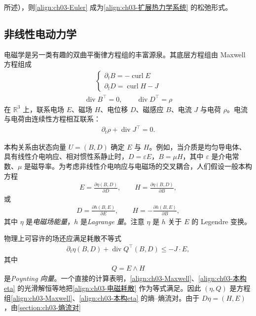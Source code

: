 ﻿\documentclass[../../main.tex]{subfiles}
\begin{document}
所述），则\eqref{align:ch03-Euler} 成为\eqref{align:ch03-扩展热力学系统} 的松弛形式。

\subsection{非线性电动力学}\label{subsection:ch03-非线性电动力学}

电磁学是另一类有趣的双曲平衡律方程组的丰富源泉。其底层方程组由 Maxwell 方程组成
\begin{align}
\begin{cases}
\partial_{t}B=-\operatorname{curl}E\\
\partial_{t}D=\operatorname{curl}H-J
\end{cases}
\label{align:ch03-Maxwell}
\end{align}
\begin{align}
\operatorname{div}B^{\top}=0,\qquad \operatorname{div}D^{\top}=\rho
\label{align:ch03-高斯}
\end{align}
在 $\mathbb{R}^{3}$ 上，联系电场 $E$、磁场 $H$、电位移 $D$、磁感应 $B$、电流 $J$ 与电荷 $\rho$。电流与电荷由连续性方程相互联系：
\begin{align}
\partial_{t}\rho+\operatorname{div}J^{\top}=0.
\label{align:ch03-电荷守恒}
\end{align}

本构关系由状态向量 $U=(B,D)$ 确定 $E$ 与 $H$。例如，当介质是均匀导电体、具有线性介电响应、相对惯性系静止时，$D=\varepsilon E$，$B=\mu H$，其中 $\varepsilon$ 是介电常数、$\mu$ 是磁导率。为考虑非线性介电响应与电磁场的交叉耦合，人们假设一般本构方程
\begin{align}
E=\frac{\partial\eta(B,D)}{\partial D},\qquad H=\frac{\partial\eta(B,D)}{\partial B},
\label{align:ch03-本构eta}
\end{align}
或
\begin{align}
D=\frac{\partial h(B,E)}{\partial E},\qquad H=-\frac{\partial h(B,E)}{\partial B},
\label{align:ch03-本构h}
\end{align}
其中 $\eta$ 是\emph{电磁场能量}，$h$ 是\emph{Lagrange 量}。注意 $\eta$ 是 $h$ 关于 $E$ 的 Legendre 变换。

物理上可容许的场还应满足耗散不等式
\begin{align}
\partial_{t}\eta(B,D)+\operatorname{div}Q^{\top}(B,D)\leqslant-J\cdot E,
\label{align:ch03-电磁耗散}
\end{align}
其中
\begin{align}
Q=E\wedge H
\label{align:ch03-Poynting}
\end{align}
是\emph{Poynting 向量}。一个直接的计算表明，\eqref{align:ch03-Maxwell}、\eqref{align:ch03-本构eta} 的光滑解恒等地把\eqref{align:ch03-电磁耗散} 作为等式满足。因此 $(\eta,Q)$ 是方程组\eqref{align:ch03-Maxwell}、\eqref{align:ch03-本构eta} 的熵--熵流对。由于 $D\eta=(H,E)$，由\cref{section:ch03-熵流对}%
\end{document}
